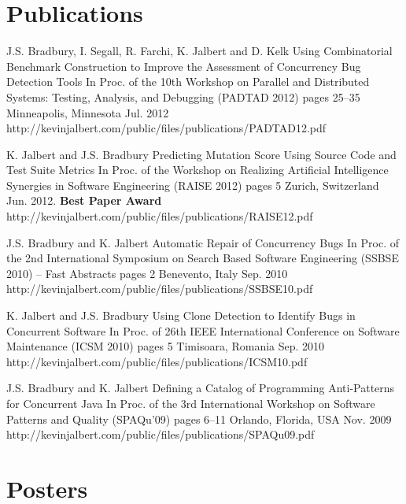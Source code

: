   \section{Publications}

  \publicationEntry
    {J.S. Bradbury, I. Segall, R. Farchi, K. Jalbert and D. Kelk}
    {Using Combinatorial Benchmark Construction to Improve the Assessment of Concurrency Bug Detection Tools}
    {In Proc. of the 10th Workshop on Parallel and Distributed Systems: Testing, Analysis, and Debugging (PADTAD 2012)}
    {pages 25--35}
    {Minneapolis, Minnesota}
    {Jul. 2012}
    {http://kevinjalbert.com/public/files/publications/PADTAD12.pdf}

  \publicationEntry
    {K. Jalbert and J.S. Bradbury}
    {Predicting Mutation Score Using Source Code and Test Suite Metrics}
    {In Proc. of the Workshop on Realizing Artificial Intelligence Synergies in Software Engineering (RAISE 2012)}
    {pages 5}
    {Zurich, Switzerland}
    {Jun. 2012. \textbf{Best Paper Award}}
    {http://kevinjalbert.com/public/files/publications/RAISE12.pdf}

  \publicationEntry
    {J.S. Bradbury and K. Jalbert}
    {Automatic Repair of Concurrency Bugs}
    {In Proc. of the 2nd International Symposium on Search Based Software Engineering (SSBSE 2010) -- Fast Abstracts}
    {pages 2}
    {Benevento, Italy}
    {Sep. 2010}
    {http://kevinjalbert.com/public/files/publications/SSBSE10.pdf}

  \publicationEntry
    {K. Jalbert and J.S. Bradbury}
    {Using Clone Detection to Identify Bugs in Concurrent Software}
    {In Proc. of 26th IEEE International Conference on Software Maintenance (ICSM 2010)}
    {pages 5}
    {Timisoara, Romania}
    {Sep. 2010}
    {http://kevinjalbert.com/public/files/publications/ICSM10.pdf}

  \publicationEntry
    {J.S. Bradbury and K. Jalbert}
    {Defining a Catalog of Programming Anti-Patterns for Concurrent Java}
    {In Proc. of the 3rd International Workshop on Software Patterns and Quality (SPAQu'09)}
    {pages 6--11}
    {Orlando, Florida, USA}
    {Nov. 2009}
    {http://kevinjalbert.com/public/files/publications/SPAQu09.pdf}

  \section{Posters}

